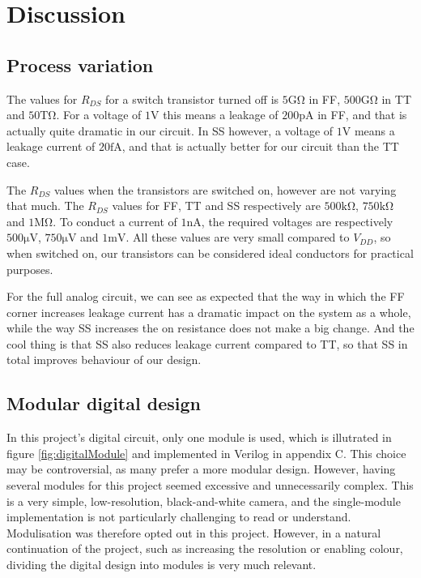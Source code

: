 \section{Discussion}
\subsection{Process variation}

The values for $R_{DS}$ for a switch transistor turned off is $5 \mathrm{G\Omega}$ in FF, $500 \mathrm{G\Omega}$ in TT and $50 \mathrm{T\Omega}$. For a voltage of $1\mathrm{V}$ this means a leakage of $200\mathrm{pA}$ in FF, and that is actually quite dramatic in our circuit. In SS however, a voltage of $1\mathrm{V}$ means a leakage current of $20\mathrm{fA}$, and that is actually better for our circuit than the TT case.

The $R_{DS}$ values when the transistors are switched on, however are not varying that much. The $R_{DS}$ values for FF, TT and SS respectively are $500 \mathrm{k\Omega}$, $750 \mathrm{k\Omega}$ and $1 \mathrm{M\Omega}$. To conduct a current of $1\mathrm{nA}$, the required voltages are respectively $500 \mathrm{\mu V}$, $750 \mathrm{\mu V}$ and $1 \mathrm{mV}$. All these values are very small compared to $V_{DD}$, so when switched on, our transistors can be considered ideal conductors for practical purposes.

For the full analog circuit, we can see as expected that the way in which the FF corner increases leakage current has a dramatic impact on the system as a whole, while the way SS increases the on resistance does not make a big change. And the cool thing is that SS also reduces leakage current compared to TT, so that SS in total improves behaviour of our design.

\subsection{Modular digital design}

In this project's digital circuit, only one module is used, which is illutrated in figure \ref{fig:digitalModule} and implemented in Verilog in appendix C. This choice may be controversial, as many prefer a more modular design. However, having several modules for this project seemed excessive and unnecessarily complex. This is a very simple, low-resolution, black-and-white camera, and the single-module implementation is not particularly challenging to read or understand. Modulisation was therefore opted out in this project. However, in a natural continuation of the project, such as increasing the resolution or enabling colour, dividing the digital design into modules is very much relevant.
